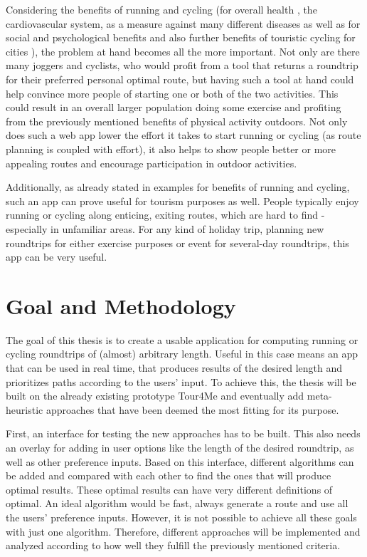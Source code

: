 Considering the benefits of running and cycling (for overall health \cite{oja_health_2011, ruegsegger_health_2018, vina_exercise_2012}, the cardiovascular system\cite{nystoriak_cardiovascular_2018}, as a measure against many different diseases\cite{oja_health_2011} as well as for social\cite{mueller_jogging_2007, obrien_jogging_2007, wankel_psychological_1990} and psychological benefits\cite{biddle_psychological_1993, cekin_psychological_2015, szabo_psychological_2013, wankel_psychological_1990} and also further benefits of touristic cycling for cities \cite{blondiau_economic_2016}), the problem at hand becomes all the more important.
Not only are there many joggers and cyclists, who would profit from a tool that returns a roundtrip for their preferred personal optimal route, but having such a tool at hand could help convince more people of starting one or both of the two activities.
This could result in an overall larger population doing some exercise and profiting from the previously mentioned benefits of physical activity outdoors. 
Not only does such a web app lower the effort it takes to start running or cycling (as route planning is coupled with effort), it also helps to show people better or more appealing routes and encourage participation in outdoor activities.

Additionally, as already stated in examples for benefits of running and cycling, such an app can prove useful for tourism purposes as well. 
People typically enjoy running or cycling along enticing, exiting routes, which are hard to find - especially in unfamiliar areas.
For any kind of holiday trip, planning new roundtrips for either exercise purposes or event for several-day roundtrips, this app can be very useful.


\section{Goal and Methodology}
\label{sec:goal}


The goal of this thesis is to create a usable application for computing running or cycling roundtrips of (almost) arbitrary length. 
Useful in this case means an app that can be used in real time, that produces results of the desired length and prioritizes paths according to the users' input. 
To achieve this, the thesis will be built on the already existing prototype Tour4Me and eventually add meta-heuristic approaches that have been deemed the most fitting for its purpose. 

First, an interface for testing the new approaches has to be built. This also needs an overlay for adding in user options like the length of the desired roundtrip, as well as other preference inputs. 
Based on this interface, different algorithms can be added and compared with each other to find the ones that will produce optimal results.
These optimal results can have very different definitions of optimal. 
An ideal algorithm would be fast, always generate a route and use all the users' preference inputs.
However, it is not possible to achieve all these goals with just one algorithm. 
Therefore, different approaches will be implemented and analyzed according to how well they fulfill the previously mentioned criteria. 

